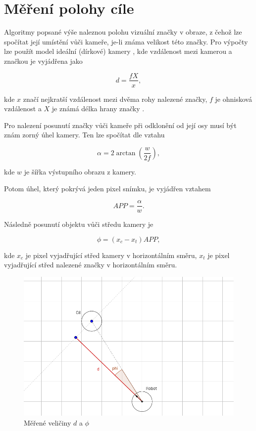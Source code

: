 \documentclass[twoside]{ctuthesis}
\theoremstyle{plain}
\theoremstyle{definition}
\theoremstyle{note}
\begin{document}
\section{Měření polohy cíle}
\label{mereni_polohy_cile}

Algoritmy popsané výše naleznou polohu vizuální značky v obraze, z čehož lze spočítat její umístění vůči kameře, je-li známa velikost této značky. Pro výpočty lze použít model ideální (dírkové) kamery \cite{cite:9}, kde vzdálenost mezi kamerou a značkou je vyjádřena jako

\begin{equation}
d = \frac{fX}{x},
\end{equation}

kde $x$ značí nejkratší vzdálenost mezi dvěma rohy nalezené značky, $f$ je ohnisková vzdálenost a $X$ je známá délka hrany značky .

Pro nalezení posunutí značky vůči kameře při odklonění od její osy musí být znám zorný úhel kamery. Ten lze spočítat dle vztahu

\begin{equation}
\alpha = 2\arctan\left(\frac{w}{2f}\right),
\end{equation}

kde $w$ je šířka výstupního obrazu z kamery.

Potom úhel, který pokrývá jeden pixel snímku, je vyjádřen vztahem

\begin{equation}
APP = \frac{\alpha}{w}.
\end{equation}

Následně posunutí objektu vůči středu kamery je

\begin{equation}
\phi = (x_c - x_t)APP,
\end{equation}

kde $x_c$ je pixel vyjadřující střed kamery v horizontálním směru, $x_t$ je pixel vyjadřující střed nalezené značky v horizontálním směru.

\begin{figure}
	\caption{Měřené veličiny $d$ a $\phi$}

	\label{mereni}
	\includegraphics[width=1\textwidth]{images/2/mereni.png}
\end{figure}
\end{document}

